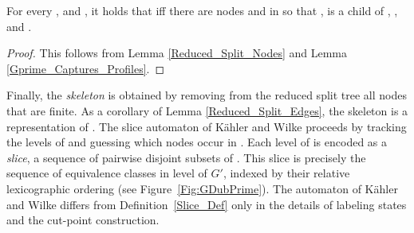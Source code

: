 \documentclass{LMCS}
\newcommand\kahler{K\"ahler\xspace}
\newcommand{\Gprime}{\ensuremath{G'}\xspace}
\begin{document}
\begin{lem}\label{Reduced_Split_Edges}
For every , and , it holds that  iff there are nodes  and  in  so that ,  is
a child of , , and . 
\end{lem}
\begin{proof}
This follows from Lemma \ref{Reduced_Split_Nodes} and Lemma \ref{Gprime_Captures_Profiles}.
\end{proof}

Finally, the \emph{skeleton}  is obtained by removing from the reduced
split tree all nodes that are finite. As a corollary of Lemma
\ref{Reduced_Split_Edges}, the skeleton is a representation of .
The slice automaton of \kahler and Wilke proceeds by tracking the levels of
 and guessing which nodes occur in .  Each level  of
 is encoded as a \emph{slice}, a sequence  of
pairwise disjoint subsets of . This slice is precisely the sequence of
equivalence classes in level  of \Gprime, indexed by their relative
lexicographic ordering (see Figure~\ref{Fig:GDubPrime}).  The automaton of
\kahler and Wilke differs from Definition~\ref{Slice_Def} only in the details
of labeling states and the cut-point construction.
\end{document}
